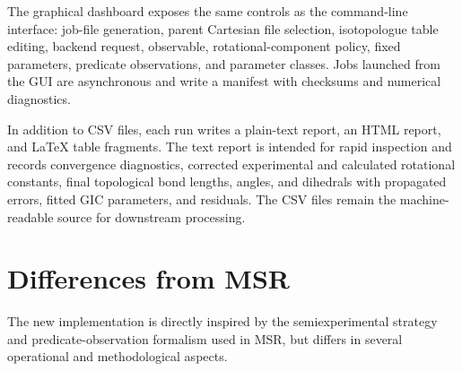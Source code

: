 \documentclass[journal=jctcce,manuscript=article,maxauthors=999]{achemso}
\begin{document}
The graphical dashboard exposes the same controls as the command-line interface: job-file generation, parent Cartesian file selection, isotopologue table editing, backend request, observable, rotational-component policy, fixed parameters, predicate observations, and parameter classes. Jobs launched from the GUI are asynchronous and write a manifest with checksums and numerical diagnostics.

In addition to CSV files, each run writes a plain-text report, an HTML report, and \LaTeX{} table fragments. The text report is intended for rapid inspection and records convergence diagnostics, corrected experimental and calculated rotational constants, final topological bond lengths, angles, and dihedrals with propagated errors, fitted GIC parameters, and residuals. The CSV files remain the machine-readable source for downstream processing.

\section{Differences from MSR}

The new implementation is directly inspired by the semiexperimental strategy and predicate-observation formalism used in MSR,\cite{Mendolicchio2017MSR} but differs in several operational and methodological aspects.
\end{document}
